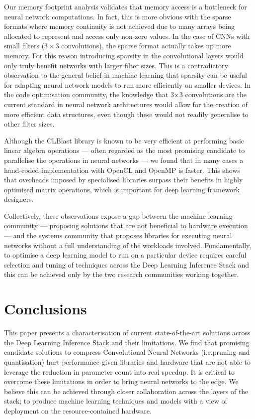 \documentclass[conference]{IEEEtran}
\begin{document}
Our memory footprint analysis validates that memory access is a bottleneck for neural network computations. In fact, this is more obvious with the sparse formats where memory continuity is not achieved due to many arrays being allocated to represent and access only non-zero values. In the case of CNNs with small filters ($3\times3$ convolutions), the sparse format actually takes up more memory. For this reason introducing sparsity in the convolutional layers would only truly benefit networks with larger filter sizes. This is a contradictory observation to the general belief in machine learning that sparsity can be useful for adapting neural network models to run more efficiently on smaller devices. In the code optimisation community, the knowledge that 3$\times$3 convolutions are the current standard in neural network architectures would allow for the creation of more efficient data structures, even though these would not readily generalise to other filter sizes.

Although the CLBlast library is known to be very efficient at performing basic linear algebra operations --- often regarded as the most promising candidate to parallelise the operations in neural networks --- we found that in many cases a hand-coded implementation with OpenCL and OpenMP is faster. This shows that overheads imposed by specialised libraries surpass their benefits in highly optimised matrix operations, which is important for deep learning framework designers.

Collectively, these observations expose a gap between the machine learning community --- proposing solutions that are not beneficial to hardware execution --- and the systems community that proposes libraries for executing neural networks without a full understanding of the workloads involved. Fundamentally, to optimise a deep learning model to run on a particular device requires careful selection and tuning of techniques across the Deep Learning Inference Stack and this can be achieved only by the two research communities working together. 

\section{Conclusions}

This paper presents a characterisation of current state-of-the-art solutions across the Deep Learning Inference Stack and their limitations. We find that promising candidate solutions to compress Convolutional Neural Networks (i.e.\weight pruning and quantisation) hurt performance given libraries and hardware that are not able to leverage the reduction in parameter count into real speedup. It is critical to overcome these limitations in order to bring neural networks to the edge. We believe this can be achieved through closer collaboration across the layers of the stack; to produce machine learning techniques and models with a view of deployment on the resource-contained hardware.
\end{document}
